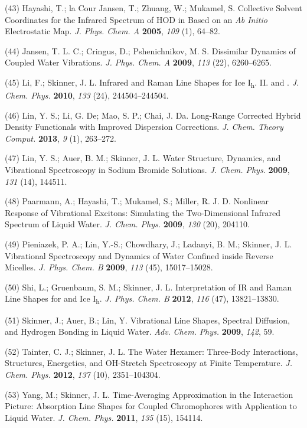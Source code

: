 (43) Hayashi, T.; la Cour Jansen, T.; Zhuang, W.; Mukamel, S. Collective Solvent Coordinates for the Infrared Spectrum of HOD in  Based on an \emph{Ab Initio} Electrostatic Map.  \emph{J. Phys. Chem. A} \textbf{2005}, \emph{109} (1), 64--82.

(44) Jansen, T. L. C.; Cringus, D.; Pshenichnikov, M. S. Dissimilar Dynamics of Coupled Water Vibrations. \emph{J. Phys. Chem. A} \textbf{2009}, \emph{113} (22), 6260--6265.

(45) Li, F.; Skinner, J. L. Infrared and Raman Line Shapes for Ice I\textsubscript{h}. II.  and .  \emph{J. Chem. Phys.} \textbf{2010}, \emph{133} (24), 244504--244504.

(46) Lin, Y. S.; Li, G. De; Mao, S. P.; Chai, J. Da. Long-Range Corrected Hybrid Density Functionals with Improved Dispersion Corrections. \emph{J. Chem. Theory Comput.} \textbf{2013}, \emph{9} (1), 263--272.

(47) Lin, Y. S.; Auer, B. M.; Skinner, J. L. Water Structure, Dynamics, and Vibrational Spectroscopy in Sodium Bromide Solutions. \emph{J. Chem.  Phys.} \textbf{2009}, \emph{131} (14), 144511.

(48) Paarmann, A.; Hayashi, T.; Mukamel, S.; Miller, R. J. D. Nonlinear Response of Vibrational Excitons: Simulating the Two-Dimensional Infrared Spectrum of Liquid Water. \emph{J. Chem. Phys.} \textbf{2009}, \emph{130} (20), 204110.

(49) Pieniazek, P. A.; Lin, Y.-S.; Chowdhary, J.; Ladanyi, B. M.; Skinner, J. L. Vibrational Spectroscopy and Dynamics of Water Confined inside Reverse Micelles. \emph{J. Phys. Chem. B} \textbf{2009}, \emph{113} (45), 15017--15028.

(50) Shi, L.; Gruenbaum, S. M.; Skinner, J. L. Interpretation of IR and Raman Line Shapes for  and  Ice I\textsubscript{h}. \emph{J. Phys. Chem. B} \textbf{2012}, \emph{116} (47), 13821--13830.

(51) Skinner, J.; Auer, B.; Lin, Y. Vibrational Line Shapes, Spectral Diffusion, and Hydrogen Bonding in Liquid Water. \emph{Adv.}  \emph{Chem.} \emph{Phys.} \textbf{2009}, \emph{142}, 59.

(52) Tainter, C. J.; Skinner, J. L. The Water Hexamer: Three-Body Interactions, Structures, Energetics, and OH-Stretch Spectroscopy at Finite Temperature. \emph{J. Chem. Phys.} \textbf{2012}, \emph{137} (10), 2351--104304.

(53) Yang, M.; Skinner, J. L. Time-Averaging Approximation in the Interaction Picture: Absorption Line Shapes for Coupled Chromophores with Application to Liquid Water. \emph{J. Chem. Phys.} \textbf{2011}, \emph{135} (15), 154114.

